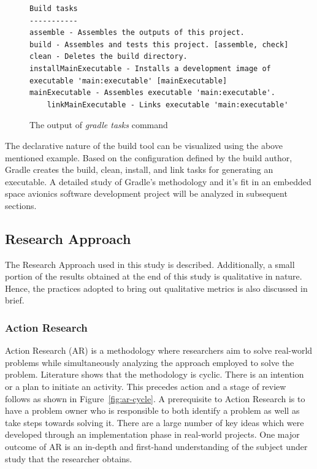 \documentclass[12pt, a4paper, titlepage]{scrartcl}
\newcommand{\courierword}[1]{\textsf{\itshape #1}}{\fontfamily{pcr}\selectfont}%
\begin{document}
\begin{figure}[!ht]
\caption{The output of \courierword{gradle tasks} command}
\label{fig:example-task-gradle}
\begin{lstlisting}[frame=single]
Build tasks
-----------
assemble - Assembles the outputs of this project.
build - Assembles and tests this project. [assemble, check]
clean - Deletes the build directory.
installMainExecutable - Installs a development image of executable 'main:executable' [mainExecutable]
mainExecutable - Assembles executable 'main:executable'.
    linkMainExecutable - Links executable 'main:executable'
\end{lstlisting}
\end{figure}
\par The declarative nature of the build tool can be visualized using the above mentioned example. Based on the configuration defined by the build author, Gradle creates the build, clean, install, and link tasks for generating an executable. A detailed study of Gradle's methodology and it's fit in an embedded space avionics software development project will be analyzed in subsequent sections. 

\subsection{Research Approach}
\par The Research Approach used in this study is described. Additionally, a small portion of the results obtained at the end of this study is qualitative in nature. Hence, the practices adopted to bring out qualitative metrics is also discussed in brief. 
\subsubsection{Action Research}
\par Action Research (AR) is a methodology where researchers aim to solve real-world problems while simultaneously analyzing the approach employed to solve the problem\cite{easterbrook2008selecting}. Literature shows that the methodology is cyclic\cite{dick2010action}. There is an intention or a plan to initiate an activity. This precedes action and a stage of review follows as shown in Figure~\ref{fig:ar-cycle}. A prerequisite to Action Research is to have a problem owner who is responsible to both identify a problem as well as take steps towards solving it. There are a large number of key ideas which were developed through an implementation phase in real-world projects\cite{greenwood2006introduction}. One major outcome of AR is an in-depth and first-hand understanding of the subject under study that the researcher obtains\cite{sjoberg2007future}.
\end{document}
